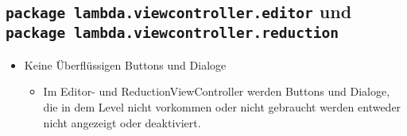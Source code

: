 \subsection{\texttt{package lambda.viewcontroller.editor} und \texttt{package lambda.viewcontroller.reduction}}
\begin{itemize}
\item Keine Überflüssigen Buttons und Dialoge
\begin{itemize} 
\item Im Editor- und ReductionViewController werden Buttons und Dialoge, die in dem Level nicht vorkommen oder nicht gebraucht werden entweder nicht angezeigt oder deaktiviert.
	\end{itemize}
\end{itemize}